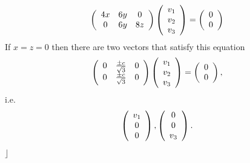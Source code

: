 \documentclass[aps,preprint]{revtex4}%
\begin{document}
\begin{equation}
\left(
\begin{array}
[c]{ccc}%
4x & 6y & 0\\
0 & 6y & 8z
\end{array}
\right)  \left(
\begin{array}
[c]{c}%
v_{1}\\
v_{2}\\
v_{3}%
\end{array}
\right)  =\left(
\begin{array}
[c]{c}%
0\\
0
\end{array}
\right)
\end{equation}
If $x=z=0$ then there are two vectors that satisfy this equation
\begin{equation}
\left(
\begin{array}
[c]{ccc}%
0 & \frac{\pm c}{\sqrt{3}} & 0\\
0 & \frac{\pm c}{\sqrt{3}} & 0
\end{array}
\right)  \left(
\begin{array}
[c]{c}%
v_{1}\\
v_{2}\\
v_{3}%
\end{array}
\right)  =\left(
\begin{array}
[c]{c}%
0\\
0
\end{array}
\right)  ,
\end{equation}
i.e.
\begin{equation}
\left(
\begin{array}
[c]{c}%
v_{1}\\
0\\
0
\end{array}
\right)  ,\left(
\begin{array}
[c]{c}%
0\\
0\\
v_{3}%
\end{array}
\right)  .
\end{equation}
$\rfloor$
\end{document}
